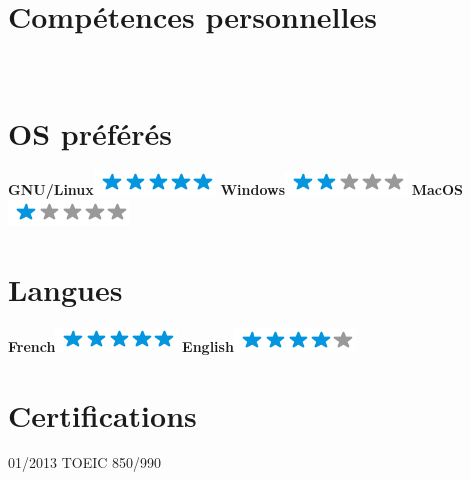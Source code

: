 \documentclass[]{friggeri-cv}
\begin{document}
\begin{aside}
~
~
~
  \section{Compétences personnelles}
    ~
  \section{OS préférés}
    \textbf{GNU/Linux}\includegraphics[scale=0.40]{img/5stars.png}
    \textbf{Windows}\includegraphics[scale=0.40]{img/2stars.png}
    \textbf{MacOS}\includegraphics[scale=0.40]{img/1stars.png}
    ~
  \section{Langues}
    \textbf{French}\includegraphics[scale=0.40]{img/5stars.png}
    \textbf{English}\includegraphics[scale=0.40]{img/4stars.png}
    ~
\end{aside}


\section{Certifications}
\begin{entrylist}
  \entry
    {01/2013}
    {TOEIC}
    {850/990}
    {}
\end{entrylist}
\newpage
\end{document}
